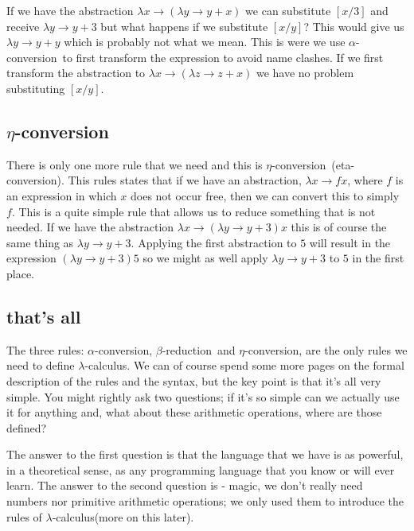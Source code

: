 \documentclass[a4paper,11pt]{article}
\newcommand{\lamc}[0]{$\lambda$-calculus}
\newcommand{\alphac}[0]{$\alpha$-conversion}
\newcommand{\betar}[0]{$\beta$-reduction}
\newcommand{\etac}[0]{$\eta$-conversion}
\begin{document}
If we have the abstraction
$\lambda x \rightarrow (\lambda y \rightarrow y + x)$ we can
substitute $[x/3]$ and receive $\lambda y \rightarrow y + 3$ but what
happens if we substitute $[x/y]$? This would give us
$\lambda y \rightarrow y + y$ which is probably not what we mean. This
is were we use \alphac\ to first transform the expression to avoid
name clashes. If we first transform the abstraction to
$\lambda x \rightarrow (\lambda z \rightarrow z + x)$ we have no
problem substituting $[x/y]$.


\subsection{\etac}

There is only one more rule that we need and this is \etac\
(eta-conversion). This rules states that if we have an abstraction,
$\lambda x \rightarrow f x$, where $f$ is an expression in which $x$
does not occur free, then we can convert this to simply $f$. This is a
quite simple rule that allows us to reduce something that is not
needed. If we have the abstraction
$\lambda x \rightarrow (\lambda y \rightarrow y + 3) x$ this is of
course the same thing as $\lambda y \rightarrow y + 3$.  Applying the
first abstraction to $5$ will result in the expression
$(\lambda y \rightarrow y + 3) 5$ so we might as well apply
$\lambda y \rightarrow y + 3$ to $5$ in the first place.


\subsection{that's all}

The three rules: \alphac, \betar\ and \etac, are the only rules we
need to define \lamc. We can of course spend some more pages on the
formal description of the rules and the syntax, but the key point is
that it's all very simple. You might rightly ask two questions; if
it's so simple can we actually use it for anything and, what about
these arithmetic operations, where are those defined? 

The answer to the first question is that the language that we have is
as powerful, in a theoretical sense, as any programming language that
you know or will ever learn. The answer to the second question is -
magic, we don't really need numbers nor primitive arithmetic
operations; we only used them to introduce the rules of \lamc (more on
this later).


\end{document}
